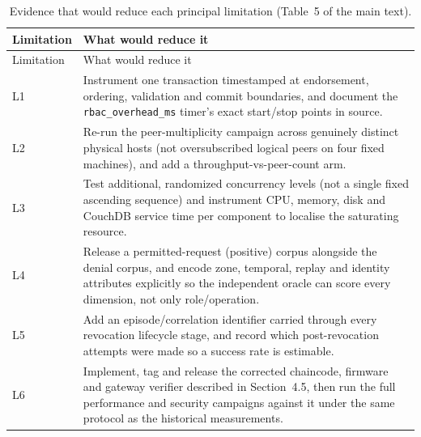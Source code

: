\documentclass[11pt]{article}
\begin{document}
\begin{longtable}{p{2.1cm}p{11cm}}
\caption{Evidence that would reduce each principal limitation (Table~5 of the main text).}\label{tab:s13}\\
\toprule
Limitation & What would reduce it \\
\midrule
\endfirsthead
\toprule
Limitation & What would reduce it \\
\midrule
\endhead
\bottomrule
\endfoot
L1 & Instrument one transaction timestamped at endorsement, ordering, validation and commit boundaries, and document the \texttt{rbac\_overhead\_ms} timer's exact start/stop points in source. \\
L2 & Re-run the peer-multiplicity campaign across genuinely distinct physical hosts (not oversubscribed logical peers on four fixed machines), and add a throughput-vs-peer-count arm. \\
L3 & Test additional, randomized concurrency levels (not a single fixed ascending sequence) and instrument CPU, memory, disk and CouchDB service time per component to localise the saturating resource. \\
L4 & Release a permitted-request (positive) corpus alongside the denial corpus, and encode zone, temporal, replay and identity attributes explicitly so the independent oracle can score every dimension, not only role/operation. \\
L5 & Add an episode/correlation identifier carried through every revocation lifecycle stage, and record which post-revocation attempts were made so a success rate is estimable. \\
L6 & Implement, tag and release the corrected chaincode, firmware and gateway verifier described in Section~4.5, then run the full performance and security campaigns against it under the same protocol as the historical measurements. \\
\end{longtable}



\end{document}
